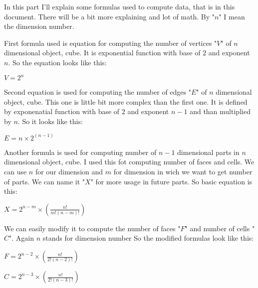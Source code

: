\documentclass[a4paper,10pt]{article}
\begin{document}
\begin{flushleft}
\vspace{-5pt}
\vspace{\baselineskip}
    \null\large{
        \quad In this part I'll explain some formulas used to compute data, that is in this document. There will be a bit more explaining and
        lot of math. By "$n$" I mean the dimension number.
    }

\vspace{-5pt}
    \null\large{
        \quad First formula used is equation for computing the number of vertices "$V$" of $n$ dimensional object, cube. It is exponential function with
        base of $2$ and exponent $n$. So the equation looks like this:} \newline
    \null\centerline{
        \Large{
            $V = 2^{n}$
        }
    }

\vspace{-5pt}
    \null\large{
        \quad Second equation is used for computing the number of edges "$E$" of $n$ dimensional object, cube. This one is little bit more complex than the
        first one. It is defined by exponenatial function with base of $2$ and exponent $n-1$ and than multiplied by $n$. So it looks like this:} \newline
    \null\centerline{
        \Large{
            $E = n\times2^{(n-1)}$
        }
    }

\vspace{-5pt}
    \null\large{
        \quad Another formula is used for computing number of $n-1$ dimensional parts in $n$ dimensional object, cube. I used this fot computing number of faces and
        cells. We can use $n$ for our dimension and $m$ for dimension in wich we want to get number of parts. We can name it "$X$" for more usage in future parts.
        So basic equation is this:} \newline
    \null\centerline{
        \Large{
            $X = 2^{n-m}\times(\frac{n!}{m!(n-m)!})$
        }
    }

\vspace{-5pt}
    \newpage
    \null\large{
        \quad We can easily modify it to compute the number of faces "$F$" and number of cells "$C$". Again $n$ stands for dimension number So the modified formulas look like this:} \newline
    \null\centerline{
        \Large{
            $F = 2^{n-2}\times(\frac{n!}{2!(n-2)!})$
        }
    }\newline
    \null\centerline{
        \Large{
            $C = 2^{n-3}\times(\frac{n!}{2!(n-3)!})$
        }
    }


\end{flushleft}
\end{document}
